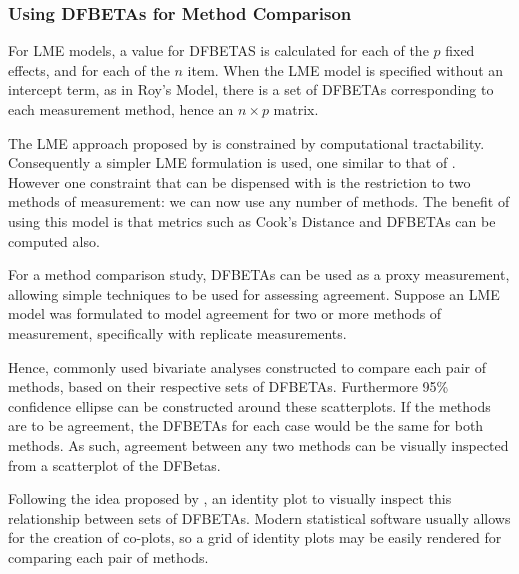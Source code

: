 \documentclass[12pt, a4paper]{report}
\theoremstyle{definition}
\theoremstyle{remark}
\begin{document}
\subsubsection{Using DFBETAs for Method Comparison}
For LME models, a value for DFBETAS is calculated for each of the $p$ fixed effects, and for each of the $n$ item. When the LME model is specified without an intercept term, as in Roy's Model, there is a set of DFBETAs corresponding to each measurement method, hence an $n \times p$ matrix.
	
The LME approach proposed by \citet{ARoy2009} is constrained by computational tractability. Consequently a simpler LME formulation is used, one similar to that of \citet{BXC2008}. However one constraint that can be dispensed with is the restriction to two methods of measurement: we can now use any number of methods. The benefit of using this model is that metrics such as Cook's Distance and DFBETAs can be computed also.
	
For a method comparison study, DFBETAs can be used as a proxy measurement, allowing simple techniques to be used for assessing agreement. Suppose an LME model was formulated to model agreement for two or more methods of measurement, specifically with replicate measurements.

Hence, commonly used bivariate analyses constructed to compare each pair of methods, based on their respective sets of DFBETAs. Furthermore 95\% confidence ellipse can be constructed around these scatterplots. If the methods are to be agreement, the DFBETAs for each case would be the same for both methods. As such, agreement between any two methods can be visually inspected from a scatterplot of the DFBetas. 
	


Following the idea proposed by \citet{BA86}, an identity plot to visually inspect this relationship between sets of DFBETAs. Modern statistical software usually allows for the creation of co-plots, so a grid of identity plots may be easily rendered for comparing each pair of methods.
\end{document}
